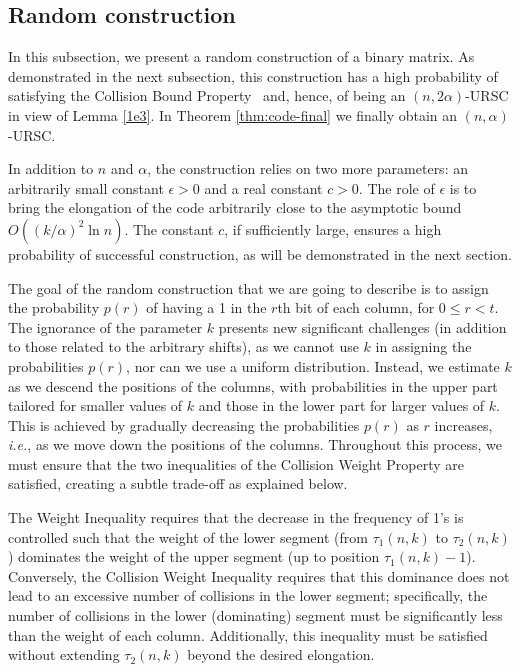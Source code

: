 \documentclass[11pt]{article}
\begin{document}
\subsection{Random construction}\label{sub:random}

In this subsection, we present a random construction of a binary matrix. 
As demonstrated in the next subsection, this construction has a high probability of 
satisfying the 
Collision Bound Property \pairCondition\
and, hence, of being an $(n, 2\alpha)$-URSC
in view of Lemma \ref{1e3}. In Theorem \ref{thm:code-final} we finally obtain 
an $(n, \alpha)$-URSC.

In addition to $n$ and $\alpha$, the construction relies on two more parameters: 
an arbitrarily small constant $\epsilon > 0$ and a real constant $c > 0$. 
The role of $\epsilon$ is to bring the elongation of the code arbitrarily close to the asymptotic bound 
$O((k/\alpha)^2 \ln n)$. The constant $c$, if sufficiently large, ensures a high probability 
of successful construction, as will be demonstrated in the next section.


The goal of the random construction that we are going to describe is to assign the probability $p(r)$ 
of having a 1 in the $r$th bit of each column, for $0 \le r < t$. The ignorance of the parameter $k$ 
presents new significant challenges (in addition to those related to the arbitrary shifts), 
as we cannot use $k$ in assigning the probabilities $p(r)$, nor can we use a uniform distribution. 
Instead, we estimate $k$ as we descend the positions of the columns, with probabilities in the upper part 
tailored for smaller values of $k$ and those in the lower part for larger values of $k$. 
This is achieved by gradually decreasing the probabilities $p(r)$ as $r$ increases, \textit{i.e.}, 
as we move down the positions of the columns. Throughout this process, we must ensure that the two 
inequalities of the Collision Weight Property are satisfied, creating a subtle trade-off as explained below.

The Weight Inequality requires that the decrease in the frequency of 1's is controlled such that the weight 
of the lower segment (from $\tau_1(n,k)$ to $\tau_2(n,k)$) dominates the weight of the upper segment 
(up to position $\tau_1(n,k)-1$). 
Conversely, the Collision Weight Inequality requires that this dominance does not lead to an excessive number of collisions in the lower segment; specifically, the number of collisions in the lower (dominating) segment must be significantly less than the weight of each column. 
Additionally, this inequality must be satisfied without extending $\tau_2(n,k)$ beyond the desired elongation.
\end{document}
